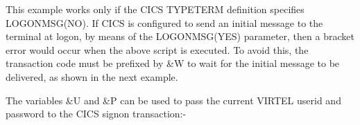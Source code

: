 \documentclass[letterpaper,10pt,english]{sphinxmanual}
\begin{document}
\begin{sphinxVerbatim}[commandchars=\\\{\}]
                        
                        
      
                     
                        
                     
                               
     
       
\end{sphinxVerbatim}


This example works only if the CICS TYPETERM definition specifies LOGONMSG(NO). If CICS is configured to send an initial message to the terminal at logon, by means of the LOGONMSG(YES) parameter, then a bracket error would occur when the above script is executed. To avoid this, the transaction code must be prefixed by \&W to wait for the initial message to be delivered, as shown in the next example.


The variables \&U and \&P can be used to pass the current VIRTEL userid and password to the CICS signon transaction:-
\end{document}
